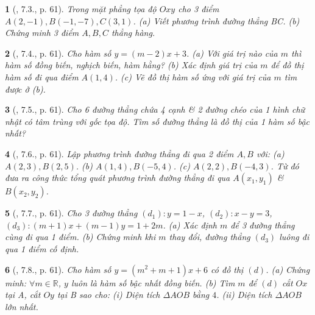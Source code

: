 \documentclass{article}
\newtheorem{baitoan}{}
\begin{document}
\begin{baitoan}[\cite{Binh_boi_duong_Toan_9_tap_1}, 7.3., p. 61]
	Trong mặt phẳng tọa độ $Oxy$ cho 3 điểm $A(2,-1),B(-1,-7),C(3,1)$. (a) Viết phương trình đường thẳng BC. (b) Chứng minh 3 điểm $A,B,C$ thẳng hàng.
\end{baitoan}

\begin{baitoan}[\cite{Binh_boi_duong_Toan_9_tap_1}, 7.4., p. 61]
	Cho hàm số $y = (m - 2)x + 3$. (a) Với giá trị nào của $m$ thì hàm số đồng biến, nghịch biến, hàm hằng? (b) Xác định giá trị của $m$ để đồ thị hàm số đi qua điểm $A(1,4)$. (c) Vẽ đồ thị hàm số ứng với giá trị của $m$ tìm được ở (b).
\end{baitoan}

\begin{baitoan}[\cite{Binh_boi_duong_Toan_9_tap_1}, 7.5., p. 61]
	Cho 6 đường thẳng chứa 4 cạnh \& 2 đường chéo của 1 hình chữ nhật có tâm trùng với gốc tọa độ. Tìm số đường thẳng là đồ thị của 1 hàm số bậc nhất?
\end{baitoan}

\begin{baitoan}[\cite{Binh_boi_duong_Toan_9_tap_1}, 7.6., p. 61]
	Lập phương trình đường thẳng đi qua 2 điểm $A,B$ với: (a) $A(2,3),B(2,5)$. (b) $A(1,4),B(-5,4)$. (c) $A(2,2),B(-4,3)$. Từ đó đưa ra công thức tổng quát phương trình đường thẳng đi qua $A(x_1,y_1)$ \& $B(x_2,y_2)$.
\end{baitoan}

\begin{baitoan}[\cite{Binh_boi_duong_Toan_9_tap_1}, 7.7., p. 61]
	Cho 3 đường thẳng $(d_1):y = 1 - x$, $(d_2):x - y = 3$, $(d_3):(m + 1)x + (m - 1)y = 1 + 2m$. (a) Xác định $m$ để 3 đường thẳng cùng đi qua 1 điểm. (b) Chứng minh khi $m$ thay đổi, đường thẳng $(d_3)$ luông đi qua 1 điểm cố định.
\end{baitoan}

\begin{baitoan}[\cite{Binh_boi_duong_Toan_9_tap_1}, 7.8., p. 61]
	Cho hàm số $y = (m^2 + m + 1)x + 6$ có đồ thị $(d)$. (a) Chứng minh: $\forall m\in\mathbb{R}$, $y$ luôn là hàm số bậc nhất đồng biến. (b) Tìm $m$ để $(d)$ cắt $Ox$ tại A, cắt $Oy$ tại B sao cho: (i) Diện tích $\Delta AOB$ bằng $4$. (ii) Diện tích $\Delta AOB$ lớn nhất.
\end{baitoan}
\end{document}

